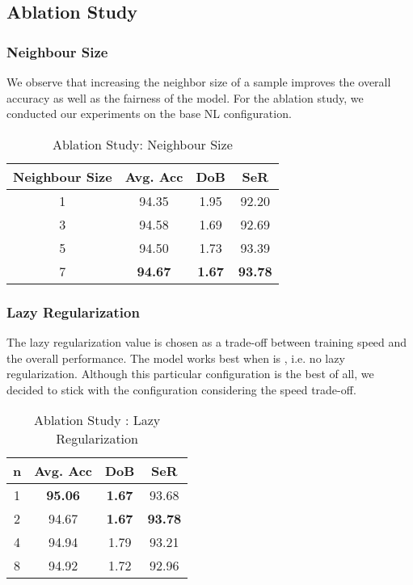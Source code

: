 \documentclass[runningheads]{llncs}
\begin{document}
\subsection{Ablation Study}
\subsubsection{Neighbour Size}
We observe that increasing the neighbor size of a sample improves the overall accuracy as well as the fairness of the model. For the ablation study, we conducted our experiments on the base NL configuration.

\begin{table}[H]
    \centering
    \caption{Ablation Study: Neighbour Size}
    \label{tab:ablate_neighbour}
    \begin{tabular}{cccc} 
    \toprule
    \textbf{Neighbour Size} & \textbf{Avg. Acc } & \textbf{DoB } & \textbf{SeR } \\ \midrule
    1 & 94.35 & 1.95 & 92.20 \\
    3 & 94.58 & 1.69 & 92.69 \\
    5 & 94.50 & 1.73 & 93.39 \\
    7 & \textbf{94.67} & \textbf{1.67} & \textbf{93.78}\\
    \bottomrule
    \end{tabular}
    
\end{table}

\subsubsection{Lazy Regularization}
The lazy regularization value is chosen as a trade-off between training speed and the overall performance. The model works best when  is , i.e. no lazy regularization. Although this particular configuration is the best of all, we decided to stick with the  configuration considering the speed trade-off.
\begin{table}[H]
    \centering
    \caption{Ablation Study : Lazy Regularization}
    \label{tab:ablate_lazy}
    \begin{tabular}{cccc} 
    \toprule
    \textbf{n} & \textbf{Avg. Acc } & \textbf{DoB } & \textbf{SeR } \\ \midrule
    1 & \textbf{95.06} & \textbf{1.67} & 93.68 \\
    2 & 94.67 & \textbf{1.67} & \textbf{93.78} \\
    4 & 94.94 & 1.79 & 93.21 \\
    8 & 94.92 & 1.72 & 92.96 \\
    \bottomrule
    \end{tabular}
\end{table}
\end{document}
